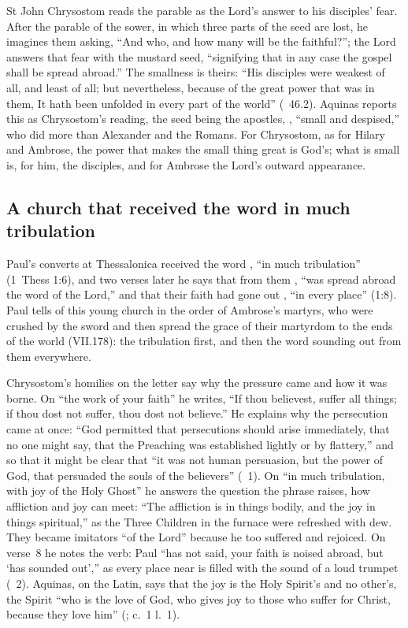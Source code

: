 St John Chrysostom reads the parable as the Lord's answer to his disciples'
fear. After the parable of the sower, in which three parts of the seed are
lost, he imagines them asking, ``And who, and how many will be the
faithful?''; the Lord answers that fear with the mustard seed, ``signifying
that in any case the gospel shall be spread abroad.'' The smallness is theirs: ``His disciples were weakest of all,
and least of all; but nevertheless, because of the great power that was in
them, It hath been unfolded in every part of the world'' (~46.2). Aquinas reports this as Chrysostom's reading, the seed being the
apostles, , ``small and despised,'' who did more than
Alexander and the Romans. For Chrysostom, as for Hilary and Ambrose, the power
that makes the small thing great is God's; what is small is, for him, the
disciples, and for Ambrose the Lord's outward appearance.

\subsection{A church that received the word in much tribulation}
\label{sec:seed-thessalonica}

Paul's converts at Thessalonica received the word , ``in much tribulation'' (1~Thess 1:6), and two verses
later he says that from them , ``was spread
abroad the word of the Lord,'' and that their faith had gone out , ``in every place'' (1:8). Paul tells of this young church in the order
of Ambrose's martyrs, who were crushed by the sword and then spread the grace
of their martyrdom to the ends of the world (VII.178): the tribulation first,
and then the word sounding out from them everywhere.

Chrysostom's homilies on the letter say why the pressure came and how it was
borne. On
``the work of your faith'' he writes, ``If thou believest, suffer all things;
if thou dost not suffer, thou dost not believe.'' He explains why the
persecution came at once: ``God permitted that persecutions should arise
immediately, that no one might say, that the Preaching was established lightly
or by flattery,'' and so that it might be clear that ``it was not human
persuasion, but the power of God, that persuaded the souls of the believers''
(~1). On ``in much tribulation, with joy of the Holy
Ghost'' he answers the question the phrase raises, how affliction and joy can
meet:
``The affliction is in things bodily, and the joy in things spiritual,'' as the
Three Children in the furnace were refreshed with dew. They became imitators
``of the Lord'' because he too suffered and rejoiced. On verse~8 he notes the
verb: Paul ``has not said, your faith is noised abroad, but `has sounded
out','' as every place near is filled with the sound of a loud trumpet
(~2). Aquinas, on the Latin, says that the joy is the Holy
Spirit's and no other's, the Spirit ``who is the love of God, who gives joy to
those who suffer for Christ, because they love him'' (;
 c.~1 l.~1).

